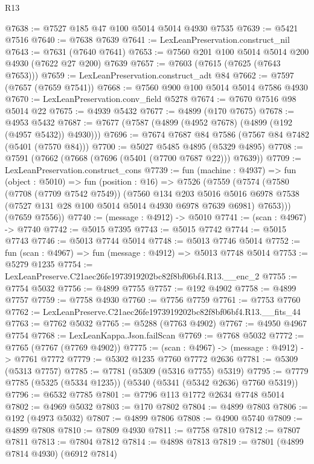 \begin{lexlean}{R13}
\begin{coremodule}
@7638 := @7527 @185 @47 @100 @5014 @5014 @4930 @7535
@7639 := @5421 @7516
@7640 := @7638 @7639
@7641 := LexLeanPreservation.construct_nil
@7643 := @7631 (@7640 @7641)
@7653 := @7560 @201 @100 @5014 @5014 @200 @4930 (@7622 @27 @200) @7639
@7657 := @7603 (@7615 (@7625 (@7643 @7653)))
@7659 := LexLeanPreservation.construct_adt @84
@7662 := @7597 (@7657 (@7659 @7541))
@7668 := @7560 @900 @100 @5014 @5014 @7586 @4930
@7670 := LexLeanPreservation.conv_field @5278
@7674 := @7670 @7516 @98 @5014 @22
@7675 := @4939 @5432
@7677 := @4899 (@170 @7675)
@7678 := @4953 @5432
@7687 := @7677 (@7587 (@4899 (@4952 @7678) (@4899 (@192 (@4957 @5432)) @4930)))
@7696 := @7674 @7687 @84 @7586 (@7567 @84 @7482 (@5401 (@7570 @84)))
@7700 := @5027 @5485 @4895 (@5329 @4895)
@7708 := @7591 (@7662 (@7668 (@7696 (@5401 (@7700 @7687 @22))) @7639))
@7709 := LexLeanPreservation.construct_cons
@7739 := fun (machine : @4937) =>
  fun (object : @5010) =>
  fun (position : @16) =>
  @7526
    (@7559
      (@7574
        (@7580
          (@7708 (@7709 @7542 @7549))
          (@7560
            @134
            @203
            @5016
            @5016
            @6978
            @7538
            (@7527 @131 @28 @100 @5014 @5014 @4930 @6978 @7639 @6981)
            @7653)))
      (@7659 @7556))
@7740 := (message : @4912) -> @5010
@7741 := (scan : @4967) -> @7740
@7742 := @5015 @7395
@7743 := @5015 @7742
@7744 := @5015 @7743
@7746 := @5013 @7744 @5014
@7748 := @5013 @7746 @5014
@7752 := fun (scan : @4967) => fun (message : @4912) => @5013 @7748 @5014
@7753 := @5279 @1235
@7754 := LexLeanPreserve.C21aec26fe1973919202bc82f8bf06bf4.R13.__enc_2
@7755 := @7754 @5032
@7756 := @4899 @7755
@7757 := @192 @4902
@7758 := @4899 @7757
@7759 := @7758 @4930
@7760 := @7756 @7759
@7761 := @7753 @7760
@7762 := LexLeanPreserve.C21aec26fe1973919202bc82f8bf06bf4.R13.__fits_44
@7763 := @7762 @5032
@7765 := @5288 (@7763 @4902)
@7767 := @4950 @4967 @7754
@7768 := LexLeanKappa.Json.failScan
@7769 := @7768 @5032
@7772 := @7765 (@7767 (@7769 @4902))
@7775 := (scan : @4967) -> (message : @4912) -> @7761 @7772
@7779 := @5302 @1235 @7760 @7772 @2636
@7781 := @5309 (@5313 @7757)
@7785 := @7781 (@5309 (@5316 @7755) @5319)
@7795 := @7779 @7785 (@5325 (@5334 @1235)) (@5340 (@5341 (@5342 @2636) @7760 @5319))
@7796 := @6532 @7785
@7801 := @7796 @113 @1772 @2634 @7748 @5014
@7802 := @4969 @5032
@7803 := @170 @7802
@7804 := @4899 @7803
@7806 := @192 (@4973 @5032)
@7807 := @4899 @7806
@7808 := @4900 @5740
@7809 := @4899 @7808
@7810 := @7809 @4930
@7811 := @7758 @7810
@7812 := @7807 @7811
@7813 := @7804 @7812
@7814 := @4898 @7813
@7819 := @7801 (@4899 @7814 @4930) (@6912 @7814)

\end{coremodule}
\end{lexlean}
